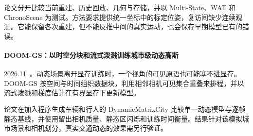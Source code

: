 论文分开比较当前重建、历史回放、几何与存储，并以 Multi-State、WAT 和 ChronoScene 为测试。方法要求提供统一坐标中的标定位姿，复访间缺少连续观测。它能保留各次重建，但不能反推中间的真实运动，也会保存早期模型已有的错误。

\paragraph{DOOM-GS：以时空分块和流式泼溅训练城市级动态高斯}
2026.11~\cite{2611_22805}。动态场景离开显存训练时，一个视角的可见原语也可能塞不进显存。DOOM-GS 按空间与时间组织数据块，利用相邻相机可见集合重叠来排程，并以流式泼溅和梯度估计在有界显存下更新模型。

论文在加入程序生成车辆和行人的 DynamicMatrixCity 比较单一动态模型与逐帧静态基线，并使用留出相机质量、静态区闪烁和训练时间衡量。结果针对该模拟城市场景和相机划分，真实交通动态的效果需另行验证。
